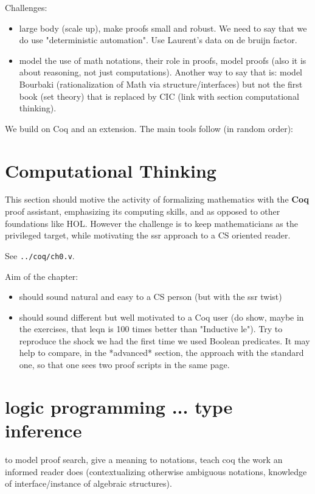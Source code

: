 Challenges:
\begin{itemize}
\item large body (scale up), make proofs small and robust.
	We need to say that we do use "deterministic automation".
	Use Laurent's data on de bruijn factor.
\item model the use of math notations, their role in proofs, model proofs (also
	it is about reasoning, not just computations). Another way to say that
	is: model Bourbaki (rationalization of Math via structure/interfaces)
	but not the first book (set theory) that is replaced by CIC (link with
	section computational thinking).
\end{itemize}

We build on Coq and an extension.  The main tools follow (in random order):

\section{Computational Thinking}\label{ch:compthink}

This section should motive the activity of formalizing mathematics
with the {\bf Coq} proof assistant, emphasizing its computing skills,
and as opposed to other foundations like HOL. However the challenge is
to keep mathematicians as the privileged target, while motivating the
ssr approach to a CS oriented reader.

See \verb+../coq/ch0.v+.

Aim of the chapter:
\begin{itemize}
\item should sound natural and easy to a CS person (but with the ssr twist)
\item should sound different but well motivated to a Coq user (do show, maybe in
  the exercises, that leqn is 100 times better than "Inductive le").  Try to
  reproduce the shock we had the first time we used Boolean predicates.  It may
  help to compare, in the *advanced* section, the approach with the standard
  one, so that one sees two proof scripts in the same page.
\end{itemize}

\section{logic programming ... type inference}
to model proof search, give a meaning to notations, teach coq the
work an informed reader does (contextualizing otherwise ambiguous
notations, knowledge of interface/instance of algebraic structures).

